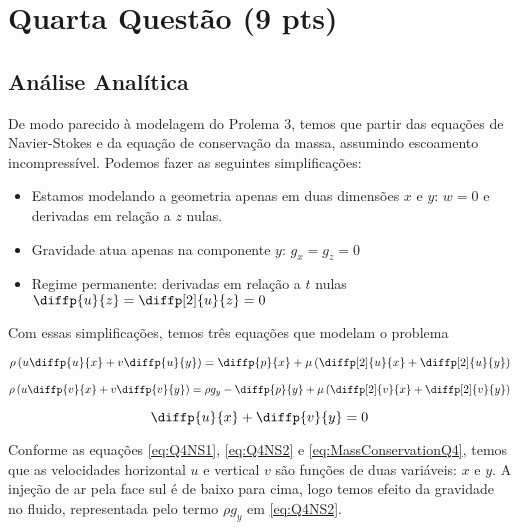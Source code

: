 
\section{Quarta Questão (9 pts)}

\subsection{Análise Analítica}


De modo parecido à modelagem do Prolema 3, temos que partir das equações de Navier-Stokes e 
da equação de conservação da massa, assumindo escoamento incompressível. 
Podemos fazer as seguintes simplificações:

\begin{itemize}
    \item Estamos modelando a geometria apenas em duas dimensões $x$ e $y$: $w = 0$ e derivadas em relação a $z$ nulas.
    \item Gravidade atua apenas na componente $y$: $g_x = g_z = 0$
    \item Regime permanente: derivadas em relação a $t$ nulas
    $\diffp{u}{z} = \diffp[2]{u}{z} = 0$ 
\end{itemize}

Com essas simplificações, temos três equações que modelam o problema

\begin{equation}\label{eq:Q4NS1}
        \rho\left(u\diffp{u}{x} + v\diffp{u}{y}\right)
         = \diffp{p}{x} + \mu \left(\diffp[2]{u}{x} + \diffp[2]{u}{y}\right)
\end{equation}

\begin{equation}\label{eq:Q4NS2}
        \rho\left(u\diffp{v}{x} + v\diffp{v}{y}\right)
         = \rho g_y - \diffp{p}{y} + \mu \left(\diffp[2]{v}{x} + \diffp[2]{v}{y}\right)
\end{equation}

\begin{equation}\label{eq:MassConservationQ4}
    \diffp{u}{x} + \diffp{v}{y} = 0
\end{equation}

Conforme as equações \eqref{eq:Q4NS1}, \eqref{eq:Q4NS2} e \eqref{eq:MassConservationQ4},
temos que as velocidades horizontal $u$ e vertical $v$ são funções de duas variáveis: $x$ e $y$.
A injeção de ar pela face sul é de baixo para cima, logo temos efeito da gravidade no fluido,
representada pelo termo $\rho g_y$ em \eqref{eq:Q4NS2}. 

